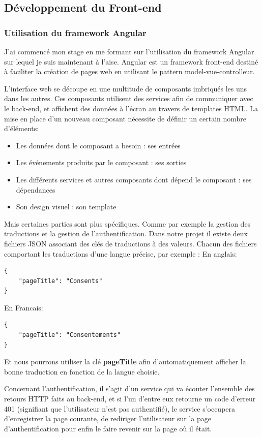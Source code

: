 \documentclass[12pt, a4paper]{report}
\newcommand\tab[1][1cm]{\hspace*{#1}}
\begin{document}
\subsection{Développement du Front-end}
\subsubsection{Utilisation du framework Angular}
\tab{}J'ai commencé mon stage en me formant sur l'utilisation du framework Angular sur lequel je suis maintenant à l'aise.\newline
Angular est un framework front-end destiné à faciliter la création de pages web en utilisant le pattern model-vue-controlleur.

L'interface web se découpe en une multitude de composants imbriqués les uns dans les autres.
Ces composants utilisent des services afin de communiquer avec le back-end, et affichent des données à l'écran au travers de templates HTML.
La mise en place d'un nouveau composant nécessite de définir un certain nombre d'éléments:
\begin{itemize}
    \item Les données dont le composant a besoin : ses entrées
    \item Les événements produits par le composant : ses sorties
    \item Les différents services et autres composants dont dépend le composant : ses dépendances
    \item Son design visuel : son template\newline
\end{itemize}
Mais certaines parties sont plus spécifiques. Comme par exemple la gestion des traductions et la gestion de l'authentification.
Dans notre projet il existe deux fichiers JSON associant des clés de traductions à des valeurs. Chacun des fichiers comportant les traductions d'une langue précise, par exemple :\newline
En anglais:
\begin{lstlisting}
{
    "pageTitle": "Consents"
}
\end{lstlisting}
En Francais:
\begin{lstlisting}
{
    "pageTitle": "Consentements"
}
\end{lstlisting}
Et nous pourrons utiliser la clé \textbf{pageTitle} afin d'automatiquement afficher la bonne traduction en fonction de la langue choisie.\newline

Concernant l'authentification, il s'agit d'un service qui va écouter l'ensemble des retours HTTP faits au back-end, et si l'un d'entre eux retourne un code d'erreur 401 (signifiant que l'utilisateur n'est pas authentifié), le service s'occupera d'enregistrer la page courante, de rediriger l'utilisateur sur la page d'authentification pour enfin le faire revenir sur la page où il était.\newline
\end{document}
